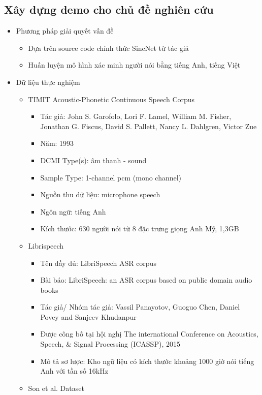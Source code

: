 \documentclass{article}
\begin{document}
	\subsection{Xây dựng demo cho chủ đề nghiên cứu}
	\begin{itemize}
		\item Phương pháp giải quyết vấn đề
		\begin{itemize}
			\item Dựa trên source code chính thức SincNet từ tác giả
			\item Huấn luyện mô hình xác minh người nói bằng tiếng Anh, tiếng Việt
		\end{itemize}
		\item Dữ liệu thực nghiệm
		\begin{itemize}
			\item TIMIT Acoustic-Phonetic Continuous Speech Corpus
			\begin{itemize}
				\item Tác giả: 	John S. Garofolo, Lori F. Lamel, William M. Fisher, Jonathan G. Fiscus, David S. Pallett, Nancy L. Dahlgren, Victor Zue
				\item Năm: 1993
				\item DCMI Type(s): âm thanh - sound
				\item Sample Type: 1-channel pcm (mono channel)
				\item Nguồn thu dữ liệu: microphone speech
				\item Ngôn ngữ: tiếng Anh
				\item Kích thước: 630 người nói từ 8 đặc trưng giọng Anh Mỹ, 1,3GB
			\end{itemize}
			\item Librispeech
			\begin{itemize}
				\item Tên đầy đủ: LibriSpeech ASR corpus
				\item Bài báo: LibriSpeech: an ASR corpus based on public domain audio books
				\item Tác giả/ Nhóm tác giả: Vassil Panayotov, Guoguo Chen, Daniel Povey and Sanjeev Khudanpur
				\item Được công bố tại hội nghị The international Conference on Acoustics, Speech, \& Signal Processing (ICASSP), 2015
				\item Mô tả sơ lược: Kho ngữ liệu có kích thước khoảng 1000 giờ nói tiếng Anh với tần số 16kHz
			\end{itemize}
			\item Son et al. Dataset
			\begin{itemize}

\end{itemize}
\end{itemize}
\end{itemize}
\end{document}
